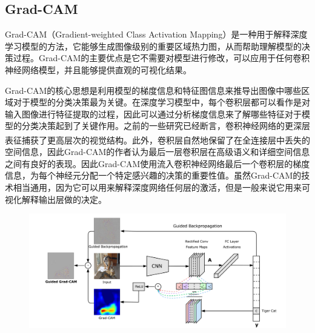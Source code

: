 \subsection{Grad-CAM}\label{sub:gradcam}
Grad-CAM（Gradient-weighted Class Activation Mapping）是一种用于解释深度学习模型的方法，它能够生成图像级别的重要区域热力图，从而帮助理解模型的决策过程。Grad-CAM的主要优点是它不需要对模型进行修改，可以应用于任何卷积神经网络模型，并且能够提供直观的可视化结果。

Grad-CAM的核心思想是利用模型的梯度信息和特征图信息来推导出图像中哪些区域对于模型的分类决策最为关键。在深度学习模型中，每个卷积层都可以看作是对输入图像进行特征提取的过程，因此可以通过分析梯度信息来了解哪些特征对于模型的分类决策起到了关键作用。之前的一些研究已经断言，卷积神经网络的更深层表征捕获了更高层次的视觉结构\textsuperscript{\cite{bengio2013representation}\cite{mahendran2016visualizing  }}。此外，卷积层自然地保留了在全连接层中丢失的空间信息，因此Grad-CAM的作者认为最后一层卷积层在高级语义和详细空间信息之间有良好的表现。因此Grad-CAM使用流入卷积神经网络最后一个卷积层的梯度信息，为每个神经元分配一个特定感兴趣的决策的重要性值。虽然Grad-CAM的技术相当通用，因为它可以用来解释深度网络任何层的激活，但是一般来说它用来可视化解释输出层做的决定。

\begin{figure}[h]
	\centering 
	\includegraphics[width=15cm]{fig/ch2/gradcam1.png}
	\label{fig:gradcam1}
\end{figure}

